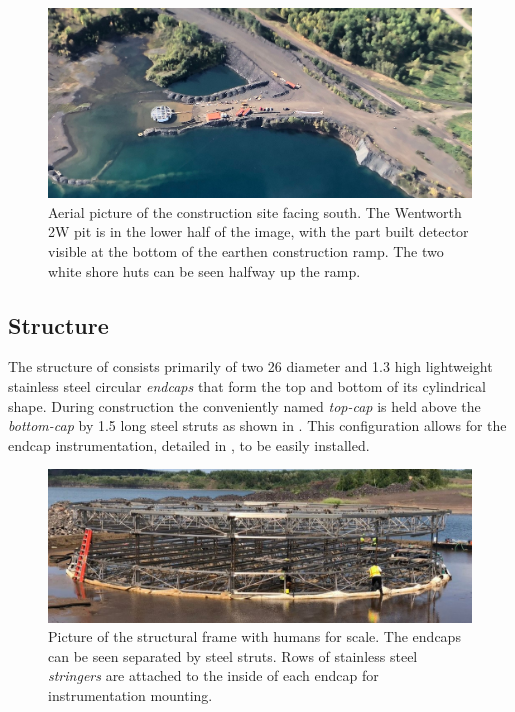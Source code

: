 \begin{figure} %
    \includegraphics[width=\textwidth]{diagrams/4-chips/from_the_air.pdf}
    \caption[Aerial picture of the \chipsfive construction site]
    {Aerial picture of the \chipsfive construction site facing south. The Wentworth 2W pit is in
        the lower half of the image, with the part built \chipsfive detector visible at the bottom
        of the earthen construction ramp. The two white shore huts can be seen halfway up the
        ramp.}
    \label{fig:from_the_sky}
\end{figure}

\subsection{Structure} %
\label{sec:chips_detector_structure} %

The structure of \chipsfive consists primarily of two \SI{26}{} diameter and
\SI{1.3}{} high lightweight stainless steel circular \emph{endcaps} that form the top and
bottom of its cylindrical shape. During construction the conveniently named \emph{top-cap} is held
above the \emph{bottom-cap} by \SI{1.5}{} long steel struts as shown in
. This configuration allows for the endcap instrumentation, detailed in
, to be easily installed.

\begin{figure} %
    \includegraphics[width=\textwidth]{diagrams/4-chips/frame.pdf}
    \caption[Picture of the \chipsfive structural frame]
    {Picture of the \chipsfive structural frame with humans for scale. The endcaps can be seen
        separated by steel struts. Rows of stainless steel \emph{stringers} are attached to the
        inside of each endcap for instrumentation mounting.}
    \label{fig:frame}
\end{figure}

